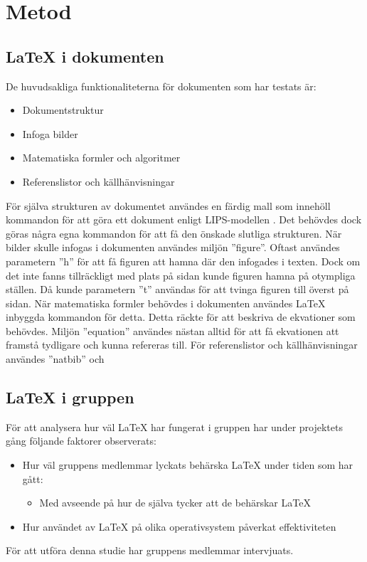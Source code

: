 \section{Metod}  

\subsection{{\LaTeX} i dokumenten}
De huvudsakliga funktionaliteterna för dokumenten som har testats är: 
\begin{itemize}
\item Dokumentstruktur
\item Infoga bilder
\item Matematiska formler och algoritmer
\item Referenslistor och källhänvisningar
\end{itemize}   
För själva strukturen av dokumentet användes en färdig mall som innehöll kommandon för att göra ett dokument enligt LIPS-modellen \citep{lips}. Det behövdes dock göras några egna kommandon för att få den önskade slutliga strukturen.
\newline
\newline
När bilder skulle infogas i dokumenten användes miljön ''figure''. Oftast användes parametern ''h'' för att få figuren att hamna där den infogades i texten. Dock om det inte fanns tillräckligt med plats på sidan kunde figuren hamna på otympliga ställen. Då kunde parametern ''t'' användas för att tvinga figuren till överst på sidan.  
\newline
\newline
När matematiska formler behövdes i dokumenten användes {\LaTeX} inbyggda kommandon för detta. Detta räckte för att beskriva de ekvationer som behövdes. Miljön ''equation'' användes nästan alltid för att få ekvationen att framstå tydligare och kunna refereras till. 
\newline
\newline
För referenslistor och källhänvisningar användes ''natbib'' och     
\subsection{{\LaTeX} i gruppen}
För att analysera hur väl {\LaTeX} har fungerat i gruppen har under projektets gång följande faktorer observerats:   
\begin{itemize}
	\item Hur väl gruppens medlemmar lyckats behärska {\LaTeX} under tiden som har gått:
	\begin{itemize}
		\item Med avseende på hur de själva tycker att de behärskar {\LaTeX} 
	\end{itemize}
	\item Hur användet av {\LaTeX} på olika operativsystem påverkat effektiviteten
\end{itemize} 
För att utföra denna studie har gruppens medlemmar intervjuats. 
